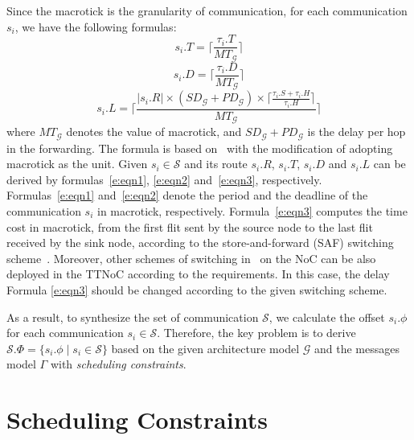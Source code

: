 \documentclass[10pt,journal]{IEEEtran}
\newcommand{\calG}{\mathcal{G}}
\newcommand{\calS}{\mathcal{S}}
\newcommand{\SD}{\mathit{SD}_\calG}
\newcommand{\HD}{\mathit{PD}_\calG}
\newcommand{\MT}{\mathit{MT}_\calG}
\theoremstyle{remark}
\begin{document}
Since the macrotick is the granularity of communication,
 for each communication $s_{i}$,
   we have the following formulas:
\begin{equation}
\label{e:eqn1}
  s_i.T = \lceil\frac{\tau_{i}.T}{\MT} \rceil
\end{equation}
\begin{equation}
\label{e:eqn2}
  s_i.D = \lceil\frac{\tau_{i}.D}{\MT}\rceil
\end{equation}
\begin{equation}
\label{e:eqn3}
  s_i.L = \lceil\frac{|s_i.R| \times (\SD+\HD) \times
    \lceil\frac{\tau_{i}.S + \tau_{i}.H}{\tau_{i}.H  }\rceil}{\MT}\rceil
\end{equation}   
where $\MT$ denotes the value of macrotick,
 and $\SD+\HD$ is the delay per hop in the forwarding.
The formula is based on~\cite{DBLP:books/daglib/0087651} with the modification of adopting macrotick as the unit.  
Given $s_{i}\in\calS$ and its route $s_i.R$,
 $s_i.T$,
  $s_i.D$ and $s_i.L$ can be derived by formulas~\ref{e:eqn1},
   \ref{e:eqn2} and~\ref{e:eqn3}, respectively.
Formulas~\ref{e:eqn1} and~\ref{e:eqn2} denote the period and the deadline of the communication $s_i$ in macrotick, respectively. 
Formula~\ref{e:eqn3} computes the time cost in
macrotick, from the first flit sent by the source node to the last
flit received by the sink node, according to the store-and-forward
(SAF) switching scheme~\cite{DBLP:books/daglib/0087651}.  
Moreover, other schemes of switching in~  \cite{DBLP:books/daglib/0087651} on the NoC can be also deployed in the TTNoC
according to the requirements. 
In this case, the delay Formula \ref{e:eqn3} should be changed according to the given switching scheme.

As a result, to synthesize the set of communication $\calS$,
 we calculate the offset $s_i.\phi$ for each communication $s_i\in\calS$.
Therefore,
 the key problem is to derive $\calS.\Phi = \{s_i.\phi\mid s_i\in\calS\}$ based on the given architecture model $\calG$ and the messages model $\Gamma$ with \emph{scheduling constraints}.


\section{Scheduling Constraints\label{s:constraint}}
\end{document}
